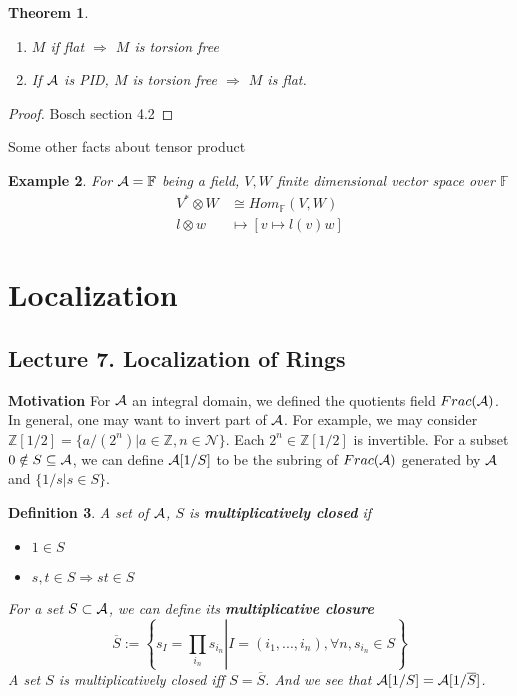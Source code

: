 \documentclass[11pt]{article}
\newtheorem{thm}{Theorem}[section]
\newtheorem{dfn}[thm]{Definition}
\newtheorem{ex}[thm]{Example}
\newcommand{\intg}{\mathbb Z}
\newcommand{\bbf}{\mathbb F}
\newcommand{\cala}{{\cal A}}
\newcommand{\Lrta}{\Longrightarrow}
\begin{document}
\begin{thm}\ 
\begin{enumerate}
\item $M$ if flat $\Lrta$ $M$ is torsion free
\item If $\cala$ is PID, $M$ is torsion free $\Lrta $ $M$ is flat.
\end{enumerate}
\end{thm}
\begin{proof}
Bosch section 4.2
\end{proof}

Some other facts about tensor product
\begin{ex}
For $\cala=\bbf$ being a field, $V, W$ finite dimensional vector space over $\bbf$
$$
\begin{aligned}
V^*\otimes W&\cong Hom_{\bbf}(V,W)\\
l\otimes w &\mapsto [v\mapsto l(v)w]
\end{aligned}
$$
\end{ex}


\section{Localization}

\subsection{Lecture 7. Localization of Rings}
\textbf{Motivation}
For $\cala$ an integral domain, we defined the quotients field $Frac(\cala)$. In general, one may want to invert part of $\cala$. For example, we may consider $\intg[1/2]=\{a/(2^n)|a\in \intg, n\in \mathcal{N}\}$. Each $2^n\in \intg[1/2]$ is invertible. For a subset $0\notin S\subseteq \cala$, we can define $\cala[1/S]$ to be the subring of $Frac(\cala)$ generated by $\cala$ and $\{1/s|s\in S\}$.

\begin{dfn}
A set of $\cala$, $S$ is \textbf{multiplicatively closed} if 
\begin{itemize}
\item $1\in S$
\item $s,t\in S\Lrta st\in S$
\end{itemize}
For a set $S\subset \cala$, we can define its \textbf{multiplicative closure}
$$
\overline{S}:=\left\{s_{I}=\left. \prod_{i_n} s_{i_n}\right| I=(i_1,...,i_n), \forall{n},  s_{i_n}\in S\right\}
$$
A set $S$ is multiplicatively closed iff $S=\overline{S}$. And we see that $\cala[1/S]=\cala[1/\overline{S}]$.
\end{dfn}
\end{document}
